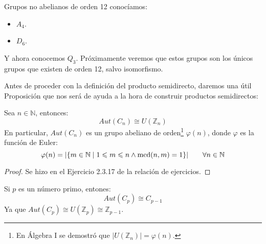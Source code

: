 \begin{ejemplo}
    Grupos no abelianos de orden 12 conocíamos:
    \begin{itemize}
        \item $A_4$.
        \item $D_6$.
    \end{itemize}
    Y ahora conocemos $Q_3$. Próximamente veremos que estos grupos son los únicos grupos que existen de orden 12, salvo isomorfismo.
\end{ejemplo}

\noindent
Antes de proceder con la definición del producto semidirecto, daremos una útil Proposición que nos será de ayuda a la hora de construir productos semidirectos:
\begin{prop}\label{prop:aut_ciclico}
    Sea $n\in \mathbb{N}$, entonces:
    \begin{equation*}
        Aut(C_n) \cong U(\mathbb{Z}_n)
    \end{equation*}
    En particular, $Aut(C_n)$ es un grupo abeliano de orden\footnote{En Álgebra I se demostró que $|U(\mathbb{Z}_n)| = \varphi(n)$.} $\varphi(n)$, donde $\varphi$ es la función de Euler:
    \begin{equation*}
        \varphi(n) = |\{m\in \mathbb{N} \mid 1\leqslant m\leqslant n \land \operatorname{mcd}(n,m)=1\}| \qquad \forall n\in \mathbb{N}
    \end{equation*}
    \begin{proof}
        Se hizo en el Ejercicio 2.3.17 de la relación de ejercicios.
    \end{proof}
\end{prop}

\begin{observacion}
    Si $p$ es un número primo, entones:
    \begin{equation*}
        Aut(C_p) \cong C_{p-1}
    \end{equation*}
    Ya que $Aut(C_p) \cong U(\mathbb{Z}_p) \cong \mathbb{Z}_{p-1}$.
\end{observacion}

